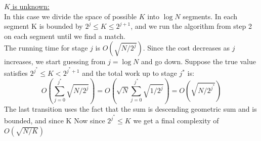 \underline{$K$ is unknown:}\\
In this case we divide the space of possible $K$ into $\log N$ segments.
In each segment K is bounded by $2^j\le K\le2^{j+1}$, and we run the algorithm from step 2 on each segment until we find a match.\\
The running time for stage $j$ is $O\left(\sqrt{N/2^j}\right)$.
Since the cost decreases as $j$ increases, we start guessing from $j=\log N$ and go down.
Suppose the true value satisfies $2^{j^*}\le K<2^{j^*+1}$ and the total work up to stage $j^*$ is:
\begin{equation*}
    O\left(\sum_{j=0}^{j^*}\sqrt{N/2^j}\right) = O\left(\sqrt{N}\sum_{j=0}^{j^*}\sqrt{1/2^j}\right) = O\left(\sqrt{N/2^{j^*}}\right)
\end{equation*}
The last transition uses the fact that the sum is descending geometric sum and is bounded, and since K
Now since $2^{j^*}\le K$ we get a final complexity of $O\left(\sqrt{N/K}\right)$
